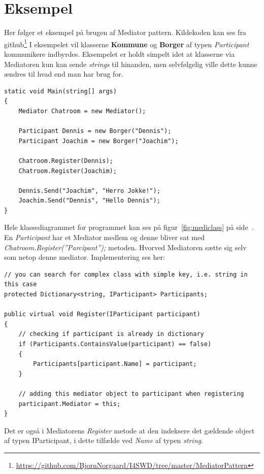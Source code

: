 \section{Eksempel}
Her følger et eksempel på brugen af Mediator pattern. Kildekoden kan ses fra github\footnote{\url{https://github.com/BjornNorgaard/I4SWD/tree/master/MediatorPattern}} I eksempelet vil klasserne \textbf{Kommune} og \textbf{Borger} af typen \textit{Participant} kommunikere indbyrdes. Eksempelet er holdt simpelt idet at klasserne via Mediatoren kun kan sende \textit{strings} til hinanden, men selvfølgelig ville dette kunne ændres til hvad end man har brug for.

\begin{lstlisting}
static void Main(string[] args)
{
	Mediator Chatroom = new Mediator();
	
	Participant Dennis = new Borger("Dennis");
	Participant Joachim = new Borger("Joachim");
	
	Chatroom.Register(Dennis);
	Chatroom.Register(Joachim);
	
	Dennis.Send("Joachim", "Herro Jokke!");
	Joachim.Send("Dennis", "Hello Dennis");
}
\end{lstlisting}

Hele klassediagrammet for programmet kan ses på figur~\ref{fig:mediclass} på side~\pageref{fig:mediclass}. En \textit{Participant} har et Mediator medlem og denne bliver sat med \textit{Chatroom.Register(''Parcipant'');} metoden. Hvorved Mediatoren sætte sig selv som netop denne mediator. Implementering ses her:

\begin{lstlisting}
// you can search for complex class with simple key, i.e. string in this case
protected Dictionary<string, IParticipant> Participants;

public virtual void Register(IParticipant participant)
{
	// checking if participant is already in dictionary
	if (Participants.ContainsValue(participant) == false)
	{
		Participants[participant.Name] = participant;
	}
	
	// adding this mediator object to participant when registering
	participant.Mediator = this;
}
\end{lstlisting}

Det er også i Mediatorens \textit{Register} metode at den indeksere det gældende object af typen IParticipant, i dette tilfælde ved \textit{Name} af typen \textit{string}. 

